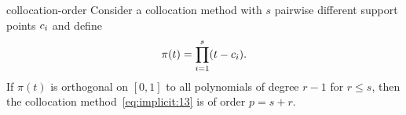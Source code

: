 \begin{Theorem}{collocation-order}
  Consider a collocation method with $s$ pairwise different support
  points $c_i$ and define
  \begin{gather}
    \label{eq:implicit:14}
    \pi(t) = \prod_{i=1}^s (t-c_i).  
  \end{gather}
  If $\pi(t)$ is orthogonal on $[0,1]$ to all polynomials of degree
  $r-1$ for $r\le s$, then the collocation
  method~\eqref{eq:implicit:13} is of order $p=s+r$.
\end{Theorem}


